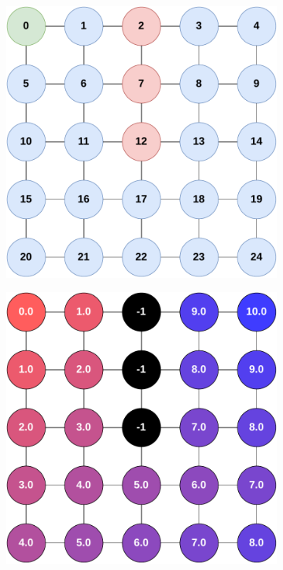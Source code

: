\begin{figure}
\begin{subfigure}[b]{.49\textwidth}
        \includegraphics[width=\textwidth]{figures/gradient-environment.pdf}
        \caption{}
        \label{fig:gradient-envronment}
    \end{subfigure}
    \hfill
    \begin{subfigure}[b]{.49\textwidth}
        \centering
        \includegraphics[width=\textwidth]{figures/gradient-environment-execution.pdf}

\end{subfigure}
\end{figure}
